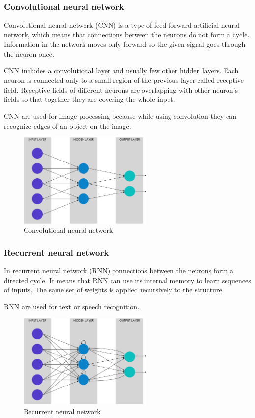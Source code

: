 \documentclass[journal, a4paper]{IEEEtran}
\begin{document}
\subsubsection{Convolutional neural network}
Convolutional neural network (CNN) is a type of feed-forward artificial neural network, which means that connections between the neurons do not form a cycle. Information in the network moves only forward so the given signal goes through the neuron once.
\par CNN includes a convolutional layer and usually few other hidden layers. Each neuron is connected only to a small region of the previous layer called receptive field. Receptive fields of different neurons are overlapping with other neuron's fields so that together they are covering the whole input.
\par CNN are used for image processing because while using convolution they can recognize edges of an object on the image.
\begin{figure}[H]
\centering
\includegraphics[width=250px]{pictures/cnn.png}
\caption{Convolutional neural network}
\end{figure}

\subsubsection{Recurrent neural network}
In recurrent neural network (RNN) connections between the neurons form a directed cycle. It means that RNN can use its internal memory to learn  sequences of inputs. The same set of weights is applied recursively to the structure.
\par RNN are used for text or speech recognition.
\begin{figure}[H]
\centering
\includegraphics[width=250px]{pictures/rnn.png}
\caption{Recurrent neural network}
\end{figure}
\end{document}

